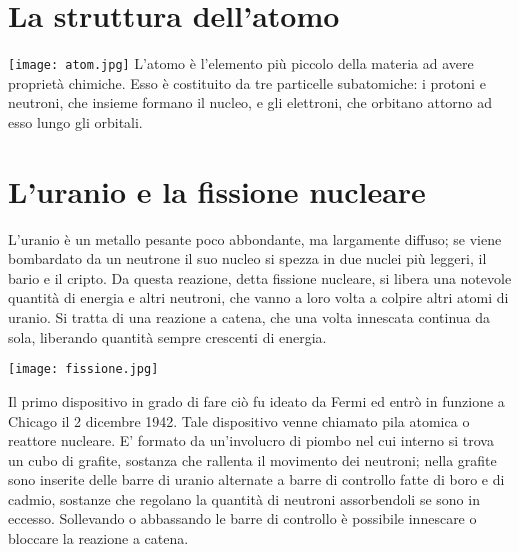 \section{La struttura dell'atomo}
\texttt{[image: atom.jpg]}
L'atomo  è l'elemento più piccolo della materia ad avere proprietà chimiche. Esso è costituito da tre particelle subatomiche: i protoni e neutroni, che insieme formano il nucleo, e gli elettroni, che orbitano attorno ad esso lungo gli orbitali.

\section{L'uranio e la fissione nucleare}
L'uranio è un metallo pesante poco abbondante, ma largamente diffuso; se viene bombardato da un neutrone il suo nucleo si spezza in due nuclei più leggeri, il bario e il cripto. Da questa reazione, detta fissione nucleare, si libera una notevole quantità di energia e altri neutroni, che vanno a loro volta a colpire altri atomi di uranio. Si tratta di una reazione a catena, che una volta innescata continua da sola, liberando quantità sempre crescenti di energia.

\noindent
\texttt{[image: fissione.jpg]}

Il primo dispositivo in grado di fare ciò fu ideato da Fermi ed entrò in funzione a Chicago il 2 dicembre 1942. Tale dispositivo venne chiamato pila atomica o reattore nucleare. E' formato da un'involucro di piombo nel cui interno si trova un cubo di grafite, sostanza che rallenta il movimento dei neutroni; nella grafite sono inserite delle barre di uranio alternate a barre di controllo fatte di boro e di cadmio, sostanze che regolano la quantità di neutroni assorbendoli se sono in eccesso. Sollevando o abbassando le barre di controllo è possibile innescare o bloccare la reazione a catena.
